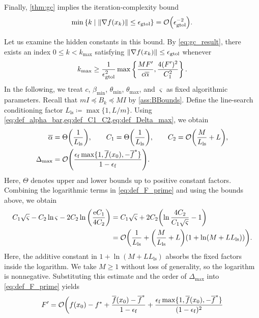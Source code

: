 \documentclass[journal_revised_MPC]{subfiles}
\begin{document}
Finally, \cref{thm:gc} implies the iteration-complexity bound
\begin{equation*}
    \min\left\{k \relmiddle| \norm{\nabla f(x_k)} \leq \gtol \right\} = \order{\gtol^{-2}}.
\end{equation*}
\begin{MPCchange}
Let us examine the hidden constants in this bound.
By \cref{eq:gc_result}, there exists an index $0 \leq k < k_{\max}$ satisfying $\norm{\nabla f(x_k)} \leq \epsilon_{\mathrm{gtol}}$ whenever
\begin{equation}
    k_{\max}\geq \frac{1}{\epsilon_{\mathrm{gtol}}^2}
    \max\left\{\frac{MF'}{c\overline\alpha},\frac{4(F')^2}{C_1^2}\right\}. \label{eq:k_max_gtol_bound}
\end{equation}
In the following, we treat $c$, $\beta_{\min}$, $\theta_{\min}$, $\theta_{\max}$, and $\varsigma$ as fixed algorithmic parameters.
Recall that $mI \preceq B_k \preceq MI$ by \cref{ass:BBounds}.
Define the line-search conditioning factor $L_{\mathrm{ls}}\coloneqq\max\{1,L/m\}$.
Using \cref{eq:def_alpha_bar,eq:def_C1_C2,eq:def_Delta_max}, we obtain
\begin{align*}
    \overline\alpha & = \Theta\qty(\frac{1}{L_{\mathrm{ls}}}), \qquad
    C_1 = \Theta\qty(\frac{1}{L_{\mathrm{ls}}}), \qquad
    C_2 = \order{\frac{M}{L_{\mathrm{ls}}} + L}, \\
    \Delta_{\max}        & = \order{\frac{\feps \max\{1, \overline f(x_0), -\overline f^*\}}{1 - \feps}}.
\end{align*}
Here, $\Theta$ denotes upper and lower bounds up to positive constant factors.
Combining the logarithmic terms in \cref{eq:def_F_prime} and using the bounds above, we obtain
\begin{align*}
    C_1 \sqrt{\varsigma} - C_2 \ln\varsigma - 2C_2 \ln\qty(\frac{\mathrm{e} C_1}{4C_2}) &= C_1 \sqrt{\varsigma} + 2C_2 \qty(\ln\frac{4C_2}{C_1 \sqrt{\varsigma}} - 1) \\
    & = \order{\frac{1}{L_{\mathrm{ls}}} + \qty(\frac{M}{L_{\mathrm{ls}}} + L) \qty(1 + \ln(M + L L_{\mathrm{ls}}))}.
\end{align*}
Here, the additive constant in $1 + \ln(M + L L_{\mathrm{ls}})$ absorbs the fixed factors inside the logarithm.
We take $M \geq 1$ without loss of generality, so the logarithm is nonnegative.
Substituting this estimate and the order of $\Delta_{\max}$ into \cref{eq:def_F_prime} yields
\begin{align*}
    F' & = \mathcal{O}\bigg(f(x_0)-f^*+\frac{\overline f(x_0)-\overline f^*}{1-\feps}
    +\frac{\feps\max\{1,\overline f(x_0),-\overline f^*\}}{(1-\feps)^2} \\

\end{align*}
\end{MPCchange}
\end{document}

